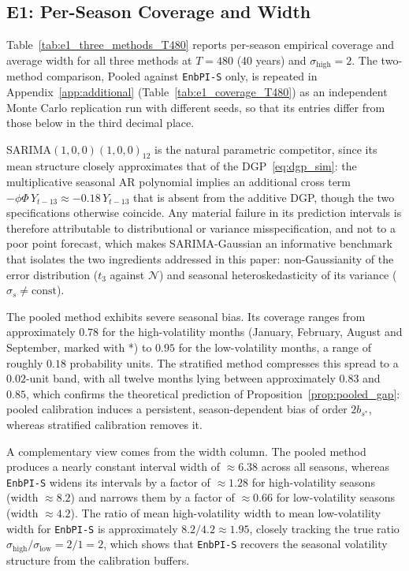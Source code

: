 \subsection{E1: Per-Season Coverage and Width}
\label{sec:simulations:e1}

Table~\ref{tab:e1_three_methods_T480} reports per-season empirical
coverage and average width for all three methods at
$T = 480$ (40 years) and $\sigma_{\mathrm{high}} = 2$.
The two-method comparison, Pooled against \texttt{EnbPI-S} only, is
repeated in Appendix~\ref{app:additional}
(Table~\ref{tab:e1_coverage_T480}) as an independent Monte Carlo
replication run with different seeds, so that its entries differ from
those below in the third decimal place.



SARIMA$(1,0,0)(1,0,0)_{12}$ is the natural parametric competitor,
since its mean structure closely approximates that of the
DGP~\eqref{eq:dgp_sim}: the multiplicative seasonal AR polynomial
implies an additional cross term $-\phi\Phi\,Y_{t-13} \approx
-0.18\,Y_{t-13}$ that is absent from the additive DGP, though the
two specifications otherwise coincide.  Any material failure in its
prediction intervals is therefore attributable to distributional or
variance misspecification, and not to a poor point forecast, which
makes SARIMA-Gaussian an informative benchmark that isolates the two
ingredients addressed in this paper: non-Gaussianity of the error
distribution ($t_3$ against $\mathcal{N}$) and seasonal
heteroskedasticity of its variance ($\sigma_s \neq \mathrm{const}$).

The pooled method exhibits severe seasonal bias.  Its coverage ranges
from approximately $0.78$ for the high-volatility months (January,
February, August and September, marked with *) to $0.95$ for the
low-volatility months, a range of roughly $0.18$ probability units.
The stratified method compresses this spread to a $0.02$-unit band,
with all twelve months lying between approximately $0.83$ and $0.85$,
which confirms the theoretical prediction of
Proposition~\ref{prop:pooled_gap}: pooled calibration induces a
persistent, season-dependent bias of order $2b_{s^*}$, whereas
stratified calibration removes it.

A complementary view comes from the width column.  The pooled method
produces a nearly constant interval width of $\approx 6.38$ across
all seasons, whereas \texttt{EnbPI-S} widens its intervals by a
factor of $\approx 1.28$ for high-volatility seasons (width
$\approx 8.2$) and narrows them by a factor of $\approx 0.66$ for
low-volatility seasons (width $\approx 4.2$).  The ratio of mean
high-volatility width to mean low-volatility width for
\texttt{EnbPI-S} is approximately $8.2/4.2 \approx 1.95$, closely
tracking the true ratio
$\sigma_{\mathrm{high}}/\sigma_{\mathrm{low}} = 2/1 = 2$, which shows
that \texttt{EnbPI-S} recovers the seasonal volatility structure from
the calibration buffers.

